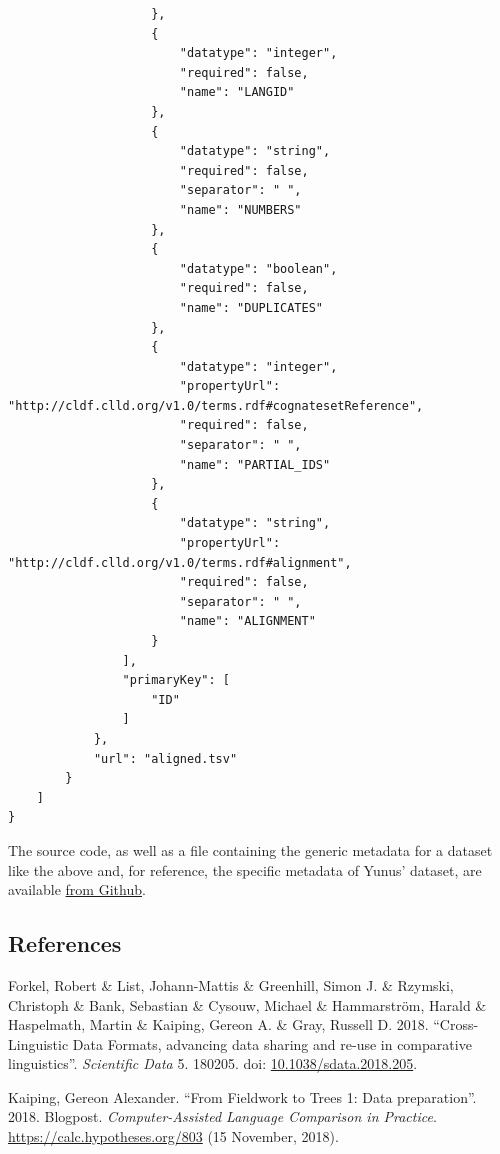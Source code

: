 \documentclass[
  english,
  a4paper,
  oneside,tablecaptionabove
]{scrbook}
\begin{document}
\begin{lstlisting}
                    },
                    {
                        "datatype": "integer",
                        "required": false,
                        "name": "LANGID"
                    },
                    {
                        "datatype": "string",
                        "required": false,
                        "separator": " ",
                        "name": "NUMBERS"
                    },
                    {
                        "datatype": "boolean",
                        "required": false,
                        "name": "DUPLICATES"
                    },
                    {
                        "datatype": "integer",
                        "propertyUrl": "http://cldf.clld.org/v1.0/terms.rdf#cognatesetReference",
                        "required": false,
                        "separator": " ",
                        "name": "PARTIAL_IDS"
                    },
                    {
                        "datatype": "string",
                        "propertyUrl": "http://cldf.clld.org/v1.0/terms.rdf#alignment",
                        "required": false,
                        "separator": " ",
                        "name": "ALIGNMENT"
                    }
                ],
                "primaryKey": [
                    "ID"
                ]
            },
            "url": "aligned.tsv"
        }
    ]
}
\end{lstlisting}

The source code, as well as a file containing the generic metadata for a
dataset like the above and, for reference, the specific metadata of
Yunus' dataset, are available
\href{https://github.com/Anaphory/matrix_to_beastling}{from Github}.

\hypertarget{references}{\subsection*{References}\label{references}}

Forkel, Robert \& List, Johann-Mattis \& Greenhill, Simon J. \&
Rzymski, Christoph \& Bank, Sebastian \& Cysouw, Michael \& Hammarström,
Harald \& Haspelmath, Martin \& Kaiping, Gereon A. \& Gray, Russell D.
2018. ``Cross-Linguistic Data Formats, advancing data sharing and re-use
in comparative linguistics''. \emph{Scientific Data} 5. 180205. doi:
\href{https://doi.org/10.1038/sdata.2018.205}{10.1038/sdata.2018.205}.

Kaiping, Gereon Alexander. ``From Fieldwork to Trees 1: Data
preparation''. 2018. Blogpost. \emph{Computer-Assisted Language Comparison
in Practice}. \url{https://calc.hypotheses.org/803} (15 November,
2018).
\end{document}
